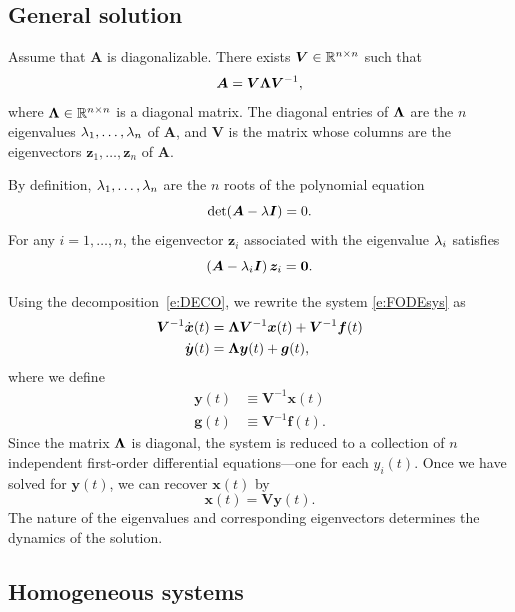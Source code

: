 \documentclass[letterpaper, 11pt, leqno]{article}
\begin{document}
\subsection{General solution}

Assume that $\bm{A}$ is diagonalizable. There exists $\bm{V}\in \mathbb{R}^{n\times n}$ such that
\begin{equation}
\bm{A}=\bm{V}\bm{\Lambda}\bm{V}^{-1},\label{e:DECO}
\end{equation}
where $\bm{\Lambda}\in \mathbb{R}^{n\times n}$ is a diagonal matrix. The diagonal entries of $\bm{\Lambda}$ are the $n$ eigenvalues $\lambda_{1},\dots,\lambda_{n}$ of $\bm{A}$, and $\bm{V}$ is the matrix whose columns are the eigenvectors $\bm{z}_{1},\dots,\bm{z}_{n}$ of $\bm{A}$. 

By definition, $\lambda_{1},\dots,\lambda_{n}$ are the $n$ roots of the polynomial equation
\begin{equation*}
\det(\bm{A}-\lambda \bm{I}) =0.
\end{equation*}
For any $i=1,\dots,n$, the eigenvector $\bm{z}_{i}$ associated with the eigenvalue $\lambda_{i}$ satisfies 
\begin{equation*}
\left( \bm{A}-\lambda_{i} \bm{I} \right) \bm{z}_{i} =\bm{0}.
\end{equation*}

Using the decomposition~\eqref{e:DECO}, we rewrite the system \eqref{e:FODEsys} as
\begin{align}
\bm{V}^{-1}\dot{\bm{x}}(t) &=\bm{\Lambda} \bm{V}^{-1}\bm{x}(t) +\bm{V}^{-1}\bm{f}(t)\nonumber\\
\dot{\bm{y}}(t) &=\bm{\Lambda} \bm{y}(t) +\bm{g}(t),\label{e:FODEsyst}
\end{align}
where we define
\begin{align*}
\bm{y}(t) &\equiv \bm{V}^{-1}\bm{x}(t)\\
\bm{g}(t) &\equiv \bm{V}^{-1}\bm{f}(t).
\end{align*}
Since the matrix $\bm{\Lambda}$ is diagonal, the system is reduced to a collection of $n$ independent first-order differential equations---one for each $y_{i}(t)$. Once we have solved for $\bm{y}(t)$, we can recover $\bm{x}(t)$ by 
\begin{equation*}
\bm{x}(t) =\bm{V} \bm{y}(t) .
\end{equation*}
The nature of the eigenvalues and corresponding eigenvectors determines the dynamics of the solution.

\subsection{Homogeneous systems}
\end{document}
